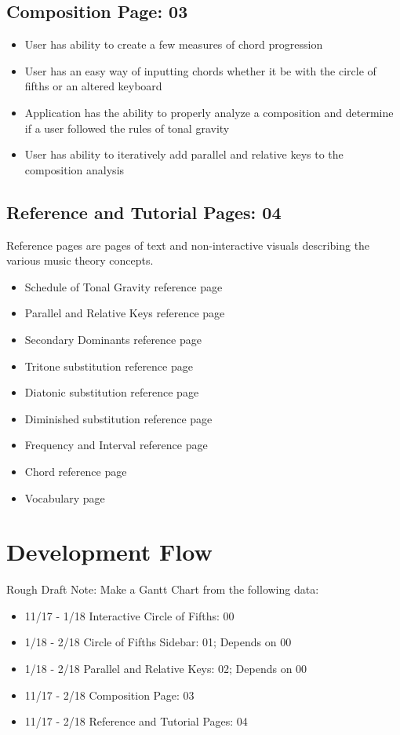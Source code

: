 \documentclass[onecolumn, draftclsnofoot,10pt, compsoc]{IEEEtran}
\begin{document}
\subsection{Composition Page: 03}
\begin{itemize}
\item User has ability to create a few measures of chord progression
\item User has an easy way of inputting chords whether it be with the circle of fifths or an altered keyboard
\item Application has the ability to properly analyze a composition and determine if a user followed the rules of tonal gravity
\item User has ability to iteratively add parallel and relative keys to the composition analysis
\end{itemize}

\pagebreak
\subsection{Reference and Tutorial Pages: 04}
Reference pages are pages of text and non-interactive visuals describing the various music theory concepts.
\begin{itemize}
\item Schedule of Tonal Gravity reference page
\item Parallel and Relative Keys reference page
\item Secondary Dominants reference page
\item Tritone substitution reference page
\item Diatonic substitution reference page
\item Diminished substitution reference page
\item Frequency and Interval reference page 
\item Chord reference page
\item Vocabulary page
\end{itemize}

\section{Development Flow}

Rough Draft Note: Make a Gantt Chart from the following data:

\begin{itemize}
\item 11/17 - 1/18 Interactive Circle of Fifths: 00
\item 1/18 - 2/18 Circle of Fifths Sidebar: 01; Depends on 00
\item 1/18 - 2/18 Parallel and Relative Keys: 02; Depends on 00
\item 11/17 - 2/18 Composition Page: 03
\item 11/17 - 2/18 Reference and Tutorial Pages: 04
\end{itemize}
\end{document}
